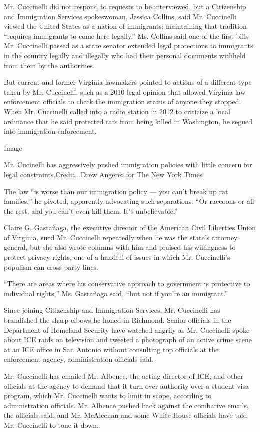 Mr. Cuccinelli did not respond to requests to be interviewed, but a
Citizenship and Immigration Services spokeswoman, Jessica Collins, said
Mr. Cuccinelli viewed the United States as a nation of immigrants;
maintaining that tradition ``requires immigrants to come here legally.''
Ms. Collins said one of the first bills Mr. Cuccinelli passed as a state
senator extended legal protections to immigrants in the country legally
and illegally who had their personal documents withheld from them by the
authorities.

But current and former Virginia lawmakers pointed to actions of a
different type taken by Mr. Cuccinelli, such as a 2010 legal opinion
that allowed Virginia law enforcement officials to check the immigration
status of anyone they stopped. When Mr. Cuccinelli called into a radio
station in 2012 to criticize a local ordinance that he said protected
rats from being killed in Washington, he segued into immigration
enforcement.

Image

Mr. Cucinelli has aggressively pushed immigration policies with little
concern for legal constraints.Credit...Drew Angerer for The New York
Times

The law ``is worse than our immigration policy --- you can't break up
rat families,'' he pivoted, apparently advocating such separations. ``Or
raccoons or all the rest, and you can't even kill them. It's
unbelievable.''

Claire G. Gastañaga, the executive director of the American Civil
Liberties Union of Virginia, sued Mr. Cuccinelli repeatedly when he was
the state's attorney general, but she also wrote columns with him and
praised his willingness to protect privacy rights, one of a handful of
issues in which Mr. Cuccinelli's populism can cross party lines.

``There are areas where his conservative approach to government is
protective to individual rights,'' Ms. Gastañaga said, ``but not if
you're an immigrant.''

Since joining Citizenship and Immigration Services, Mr. Cuccinelli has
brandished the sharp elbows he honed in Richmond. Senior officials in
the Department of Homeland Security have watched angrily as Mr.
Cuccinelli spoke about ICE raids on television and tweeted a photograph
of an active crime scene at an ICE office in San Antonio without
consulting top officials at the enforcement agency, administration
officials said.

Mr. Cuccinelli has emailed Mr. Albence, the acting director of ICE, and
other officials at the agency to demand that it turn over authority over
a student visa program, which Mr. Cuccinelli wants to limit in scope,
according to administration officials. Mr. Albence pushed back against
the combative emails, the officials said, and Mr. McAleenan and some
White House officials have told Mr. Cuccinelli to tone it down.

